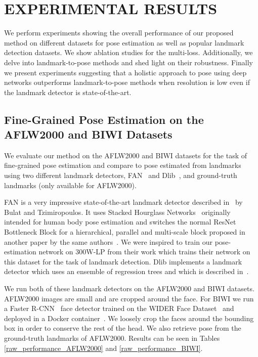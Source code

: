 \documentclass[10pt,twocolumn,letterpaper]{article}
\begin{document}
\section{EXPERIMENTAL RESULTS}\label{sec4}
We perform experiments showing the overall performance of our proposed method on different datasets for pose estimation as well as popular landmark detection datasets. We show ablation studies for the multi-loss. Additionally, we delve into landmark-to-pose methods and shed light on their robustness. Finally we present experiments suggesting that a holistic approach to pose using deep networks outperforms landmark-to-pose methods when resolution is low even if the landmark detector is state-of-the-art.

\subsection{Fine-Grained Pose Estimation on the AFLW2000 and BIWI Datasets}\label{sec4-A}
We evaluate our method on the AFLW2000 and BIWI datasets for the task of fine-grained pose estimation and compare to pose estimated from landmarks using two different landmark detectors, FAN~\cite{bulat2017far} and Dlib~\cite{kazemi2014one}, and ground-truth landmarks (only available for AFLW2000).

FAN is a very impressive state-of-the-art landmark detector described in~\cite{bulat2017far} by Bulat and Tzimiropoulos. It uses Stacked Hourglass Networks~\cite{newell2016stacked} originally intended for human body pose estimation and switches the normal ResNet Bottleneck Block for a hierarchical, parallel and multi-scale block proposed in another paper by the same authors~\cite{bulat2017binarized}. We were inspired to train our pose-estimation network on 300W-LP from their work which trains their network on this dataset for the task of landmark detection.
Dlib implements a landmark detector which uses an ensemble of regression trees and which is described in~\cite{kazemi2014one}.

We run both of these landmark detectors on the AFLW2000 and BIWI datasets. AFLW2000 images are small and are cropped around the face. For BIWI we run a Faster R-CNN~\cite{renNIPS15fasterrcnn} face detector trained on the WIDER Face Dataset~\cite{yang2016wider,jiang2017face} and deployed in a Docker container~\cite{ruiz2017dockerface}. We loosely crop the faces around the bounding box in order to conserve the rest of the head. We also retrieve pose from the ground-truth landmarks of AFLW2000. Results can be seen in Tables \ref{raw_performance_AFLW2000} and \ref{raw_performance_BIWI}.
\end{document}
